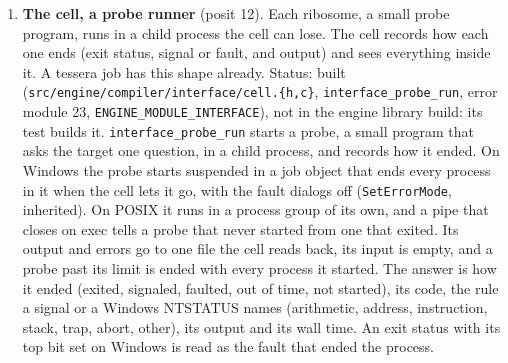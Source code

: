 \begin{enumerate}
\begin{itemize}
\begin{enumerate}
\begin{itemize}
\end{itemize}
\item \textbf{The cell, a probe runner} (posit 12). Each ribosome, a small probe program, runs in a child process the cell can lose. The cell records how each one ends (exit status, signal or fault, and output) and sees everything inside it. A tessera job has this shape already. Status: built (\texttt{src/\allowbreak{}engine/\allowbreak{}compiler/\allowbreak{}interface/\allowbreak{}cell.\allowbreak{}\{h,c\}}, \texttt{interface\_\allowbreak{}probe\_\allowbreak{}run}, error module 23, \texttt{ENGINE\_\allowbreak{}MODULE\_\allowbreak{}INTERFACE}), not in the engine library build: its test builds it. \texttt{interface\_\allowbreak{}probe\_\allowbreak{}run} starts a probe, a small program that asks the target one question, in a child process, and records how it ended. On Windows the probe starts suspended in a job object that ends every process in it when the cell lets it go, with the fault dialogs off (\texttt{Set\allowbreak{}Error\allowbreak{}Mode}, inherited). On POSIX it runs in a process group of its own, and a pipe that closes on exec tells a probe that never started from one that exited. Its output and errors go to one file the cell reads back, its input is empty, and a probe past its limit is ended with every process it started. The answer is how it ended (exited, signaled, faulted, out of time, not started), its code, the rule a signal or a Windows NTSTATUS names (arithmetic, address, instruction, stack, trap, abort, other), its output and its wall time. An exit status with its top bit set on Windows is read as the fault that ended the process.


\end{enumerate}
\end{itemize}
\end{enumerate}

